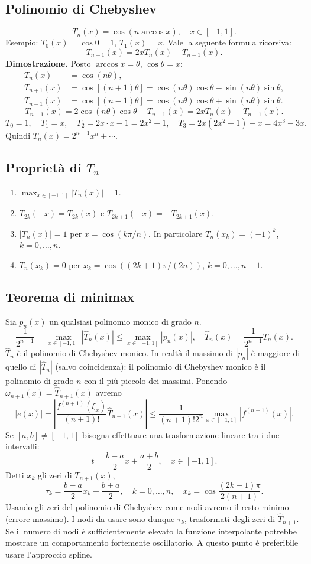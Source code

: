 \documentclass[11pt,a4paper]{article}
\newcommand{\pagina}[1]{\clearpage}
\begin{document}
\subsection*{Polinomio di Chebyshev}
\[T_n(x)=\cos(n\arccos x),\quad x\in[-1,1].\]
Esempio: $T_0(x)=\cos0=1$, $T_1(x)=x$.
\pagina{32}
Vale la seguente formula ricorsiva:
\[\boxed{T_{n+1}(x)=2xT_n(x)-T_{n-1}(x)}.\]
\textbf{Dimostrazione.} Posto $\arccos x=\theta$, $\cos\theta=x$:
\begin{align*}T_n(x)&=\cos(n\theta),\\T_{n+1}(x)&=\cos[(n+1)\theta]=\cos(n\theta)\cos\theta-\sin(n\theta)\sin\theta,\\T_{n-1}(x)&=\cos[(n-1)\theta]=\cos(n\theta)\cos\theta+\sin(n\theta)\sin\theta.\end{align*}
\[T_{n+1}(x)=2\cos(n\theta)\cos\theta-T_{n-1}(x)=2xT_n(x)-T_{n-1}(x).\]
\[T_0=1,\quad T_1=x,\quad T_2=2x\cdot x-1=2x^2-1,\quad T_3=2x(2x^2-1)-x=4x^3-3x.\]
Quindi $T_n(x)=2^{n-1}x^n+\cdots$.
\subsection*{Proprietà di $T_n$}
\begin{enumerate}\item $\max_{x\in[-1,1]}|T_n(x)|=1$.
\item $T_{2k}(-x)=T_{2k}(x)$ e $T_{2k+1}(-x)=-T_{2k+1}(x)$.
\item $|T_n(x)|=1$ per $x=\cos(k\pi/n)$. In particolare $T_n(x_k)=(-1)^k$, $k=0,\ldots,n$.
\item $T_n(x_k)=0$ per $x_k=\cos((2k+1)\pi/(2n))$, $k=0,\ldots,n-1$.\end{enumerate}
\pagina{33}\subsection*{Teorema di minimax}
Sia $p_n(x)$ un qualsiasi polinomio monico di grado $n$.
\[\frac1{2^{n-1}}=\max_{x\in[-1,1]}|\widehat T_n(x)|\le\max_{x\in[-1,1]}|p_n(x)|,\quad\widehat T_n(x)=\frac1{2^{n-1}}T_n(x).\]
$\widehat T_n$ è il polinomio di Chebyshev monico. In realtà il massimo di $|p_n|$ è maggiore di quello di $|\widehat T_n|$ (salvo coincidenza): il polinomio di Chebyshev monico è il polinomio di grado $n$ con il più piccolo dei massimi.
Ponendo $\omega_{n+1}(x)=\widehat T_{n+1}(x)$ avremo
\[|e(x)|=\left|\frac{f^{(n+1)}(\xi_x)}{(n+1)!}\widehat T_{n+1}(x)\right|\le\frac1{(n+1)!2^n}\max_{x\in[-1,1]}|f^{(n+1)}(x)|.\]
Se $[a,b]\ne[-1,1]$ bisogna effettuare una trasformazione lineare tra i due intervalli:
\[t=\frac{b-a}2x+\frac{a+b}2,\quad x\in[-1,1].\]
Detti $x_k$ gli zeri di $T_{n+1}(x)$,
\[\tau_k=\frac{b-a}2x_k+\frac{b+a}2,\quad k=0,\ldots,n,\quad x_k=\cos\frac{(2k+1)\pi}{2(n+1)}.\]
Usando gli zeri del polinomio di Chebyshev come nodi avremo il resto minimo (errore massimo). I nodi da usare sono dunque $\tau_k$, trasformati degli zeri di $\widehat T_{n+1}$.
\pagina{34}
Se il numero di nodi è sufficientemente elevato la funzione interpolante potrebbe mostrare un comportamento fortemente oscillatorio. A questo punto è preferibile usare l'approccio spline.
\end{document}

